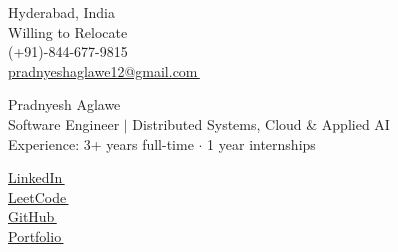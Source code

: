\documentclass[a4paper,10pt]{article}
\let\orighref\href
\renewcommand{\href}[2]{\orighref{#1}{#2\,\faExternalLink}}
\newcommand{\hskills}[1]{
\textbf{\bfseries #1} }
\begin{document}
\begin{center}
    \begin{minipage}[b]{0.4\textwidth}
            \normalsize Hyderabad, India \\
            \normalsize Willing to Relocate \\
            \large (+91)-844-677-9815 \\
            \large \href{mailto:pradnyeshaglawe12@gmail.com}{pradnyeshaglawe12@gmail.com}
    \end{minipage}%
    \begin{minipage}[b]{0.4\textwidth}
            \centering
            {\huge Pradnyesh Aglawe} \\ %
            \vspace{0.2cm}
            {\color{UI_blue} \small Software Engineer $\mid$ Distributed Systems, Cloud \& Applied AI} \\
            \vspace{0.1cm}
            {\normalsize {\color{UI_blue} Experience}: 3+ years full-time $\cdot$ 1 year internships}
    \end{minipage}%
    \begin{minipage}[b]{0.2\textwidth}
            \flushright
            \href{https://www.linkedin.com/in/pradnyesh45/}{LinkedIn} \\
            \href{https://leetcode.com/u/pradnyesh45/}{LeetCode} \\
            \href{https://github.com/pradnyesh45}{GitHub} \\
            \href{https://pradnyesh45.github.io/portfolio/}{Portfolio}
    \end{minipage}   
    
\vspace{-0.5cm} 
\end{center}
\end{document}
